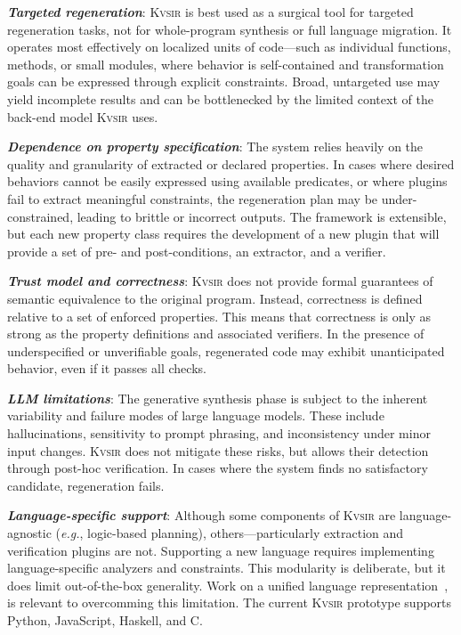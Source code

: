 \documentclass[noacm,sigplan,review]{acmart}
\def\eg{{\em e.g.}, }
\newcommand{\sys}{{\scshape Kv{\textalpha}sir}\xspace}
\newcommand{\heading}[1]{\vspace{2pt}\noindent\textbf{\emph{#1}}:\enspace}
\begin{document}
\heading{Targeted regeneration}
\sys is best used as a surgical tool for targeted regeneration tasks, not for whole-program synthesis or full language migration.
It operates most effectively on localized units of code---such as individual functions, methods, or small modules, where behavior is self-contained and transformation goals can be expressed through explicit constraints.
Broad, untargeted use may yield incomplete results and can be bottlenecked by the limited context of the back-end model \sys uses.

\heading{Dependence on property specification}
The system relies heavily on the quality and granularity of extracted or declared properties.
In cases where desired behaviors cannot be easily expressed using available predicates, or where plugins fail to extract meaningful constraints, the regeneration plan may be under-constrained, leading to brittle or incorrect outputs. The framework is extensible, but each new property class requires the development of a new plugin that will provide a set of pre- and post-conditions, an extractor, and a verifier.

\heading{Trust model and correctness}
\sys
does not provide formal guarantees
of semantic equivalence
to the original program.
Instead,
correctness is defined relative to a set of enforced properties.
This means that correctness is only as strong as the property definitions and associated verifiers.
In the presence of underspecified or unverifiable goals,
regenerated code
may exhibit unanticipated behavior,
even if it passes all checks. 


\heading{LLM limitations}
The generative synthesis phase
is subject to the inherent variability and failure modes
of large language models.
These include hallucinations,
sensitivity to prompt phrasing,
and inconsistency
under minor input changes.
\sys does not mitigate these risks,
but allows their detection
through post-hoc verification.
In cases where the system finds no satisfactory candidate,
regeneration fails.


\heading{Language-specific support}
Although some components of \sys are language-agnostic (\eg logic-based planning),
others---particularly extraction and verification plugins are not.
Supporting a new language
requires implementing language-specific analyzers and constraints.
This modularity is deliberate,
but it does limit out-of-the-box generality.
Work on a unified language representation~\cite{koppel2018onetool,bap2011,dillig2009sail},
is relevant to overcomming this limitation.
The current \sys prototype
supports Python, JavaScript, Haskell, and C. 
\end{document}
